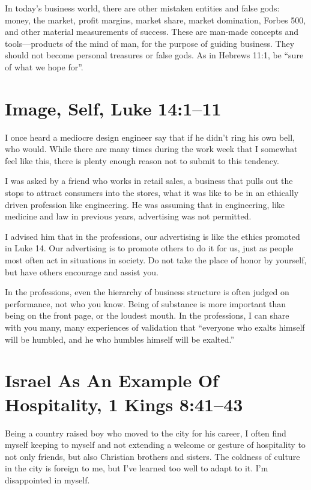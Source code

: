 \documentclass[12pt]{memoir}
\begin{document}
In today's business world, there are other mistaken entities and false
gods: money, the market, profit margins, market share, market domination,
Forbes 500, and other material measurements of success. These are
man-made concepts and tools---products of the mind of man, for the
purpose of guiding business. They should not become personal treasures
or false gods. As in Hebrews 11:1, be ``sure of what we hope for''.

\section[Self Image]{Image, Self, Luke 14:1--11}

I once heard a mediocre design engineer say that if he didn't ring his own bell, who would. While there are many times during the work week that I somewhat feel like this, there is plenty enough reason not to submit to this tendency.

I was asked by a friend who works in retail sales, a business that pulls out the stops to attract consumers into the stores, what it was like to be in an ethically driven profession like engineering.
He was assuming that in engineering, like medicine and law in previous
years, advertising was not permitted.

I advised him that in the professions, our advertising is like the ethics promoted in Luke 14. Our advertising is to promote others to do it for us, just as people most often act in situations in society. Do not take the place of honor by yourself, but have others encourage and assist you. 

In the professions, even the hierarchy of business structure is often
judged on performance, not who you know. Being of substance
is more important than being on the front page, or the loudest mouth. In the professions, I can share with you many, many experiences
of validation that ``everyone who exalts himself will be humbled, and he who humbles himself will be exalted.''

\section[Israel As An Example Of Hospitality]{Israel As An Example Of Hospitality, 1 Kings 8:41--43}

Being a country raised boy who moved to the city for his career,
I often find myself keeping to myself and not extending a welcome
or gesture of hospitality to not only friends, but also Christian
brothers and sisters. The coldness of culture in the city is foreign to me, but I've learned too well to adapt to it. I'm disappointed
in myself.
\end{document}
